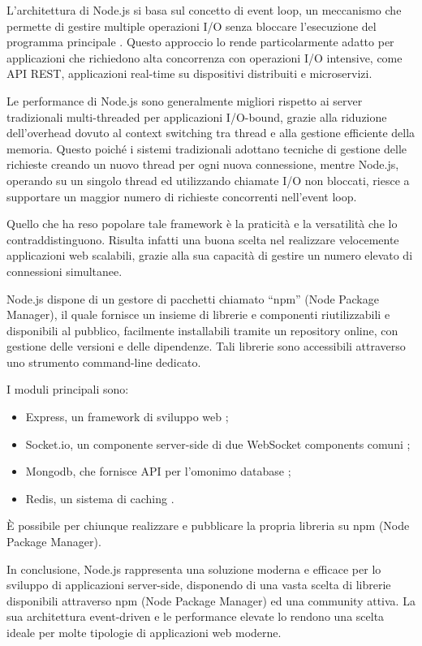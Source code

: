 L'architettura di Node.js si basa sul concetto di event loop, un meccanismo che permette di gestire multiple operazioni I/O senza bloccare l'esecuzione del programma principale \citep{nodejs_docs_2023}. Questo approccio lo rende particolarmente adatto per applicazioni che richiedono alta concorrenza con operazioni I/O intensive, come API REST, applicazioni real-time su dispositivi distribuiti e microservizi.

Le performance di Node.js sono generalmente migliori rispetto ai server tradizionali multi-threaded per applicazioni I/O-bound, grazie alla riduzione dell'overhead dovuto al context switching tra thread e alla gestione efficiente della memoria. Questo poiché i sistemi tradizionali adottano tecniche di gestione delle richieste creando un nuovo thread per ogni nuova connessione, mentre Node.js, operando su un singolo thread ed utilizzando chiamate I/O non bloccati, riesce a supportare un maggior numero di richieste concorrenti nell'event loop.

Quello che ha reso popolare tale framework è la praticità e la versatilità che lo contraddistinguono. Risulta infatti una buona scelta nel realizzare velocemente applicazioni web scalabili, grazie alla sua capacità di gestire un numero elevato di connessioni simultanee.

Node.js dispone di un gestore di pacchetti chiamato ``npm'' (Node Package Manager), il quale fornisce un insieme di librerie e componenti riutilizzabili e disponibili al pubblico, facilmente installabili tramite un repository online, con gestione delle versioni e delle dipendenze. Tali librerie sono accessibili attraverso uno strumento command-line dedicato.

I moduli principali sono:
\begin{itemize}
  \item Express, un framework di sviluppo web \cite{express_js};
  \item Socket.io, un componente server-side di due WebSocket components comuni \cite{socket_io};
  \item Mongodb, che fornisce API per l'omonimo database \cite{mongodb};
  \item Redis, un sistema di caching \cite{redis}.
\end{itemize}
È possibile per chiunque realizzare e pubblicare la propria libreria su npm (Node Package Manager).

In conclusione, Node.js rappresenta una soluzione moderna e efficace per lo sviluppo di applicazioni server-side, disponendo di una vasta scelta di librerie disponibili attraverso npm (Node Package Manager) ed una community attiva. La sua architettura event-driven e le performance elevate lo rendono una scelta ideale per molte tipologie di applicazioni web moderne.

